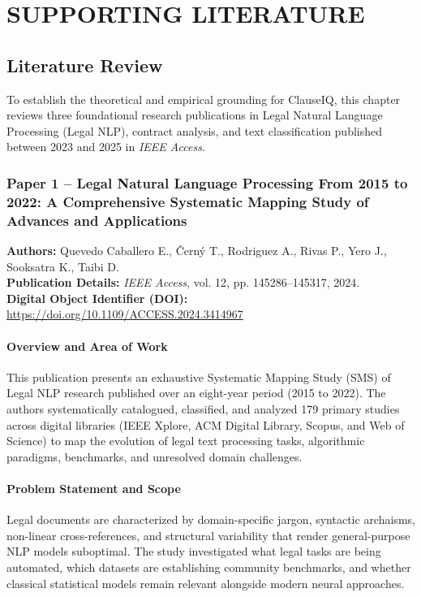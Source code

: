\chapter{SUPPORTING LITERATURE}
\label{ch:supporting_literature}

\section{Literature Review}
\label{sec:literature_review}
To establish the theoretical and empirical grounding for ClauseIQ, this chapter reviews three foundational research publications in Legal Natural Language Processing (Legal NLP), contract analysis, and text classification published between 2023 and 2025 in \textit{IEEE Access}.

\subsection*{Paper 1 -- Legal Natural Language Processing From 2015 to 2022: A Comprehensive Systematic Mapping Study of Advances and Applications}
\label{subsec:paper1}

\noindent\textbf{Authors:} Quevedo Caballero E., \v{C}ern\'{y} T., Rodriguez A., Rivas P., Yero J., Sooksatra K., Taibi D. \\
\textbf{Publication Details:} \textit{IEEE Access}, vol. 12, pp. 145286--145317, 2024. \\
\textbf{Digital Object Identifier (DOI):} \url{https://doi.org/10.1109/ACCESS.2024.3414967}

\subsubsection*{Overview and Area of Work}
This publication presents an exhaustive Systematic Mapping Study (SMS) of Legal NLP research published over an eight-year period (2015 to 2022). The authors systematically catalogued, classified, and analyzed 179 primary studies across digital libraries (IEEE Xplore, ACM Digital Library, Scopus, and Web of Science) to map the evolution of legal text processing tasks, algorithmic paradigms, benchmarks, and unresolved domain challenges.

\subsubsection*{Problem Statement and Scope}
Legal documents are characterized by domain-specific jargon, syntactic archaisms, non-linear cross-references, and structural variability that render general-purpose NLP models suboptimal. The study investigated what legal tasks are being automated, which datasets are establishing community benchmarks, and whether classical statistical models remain relevant alongside modern neural approaches.

